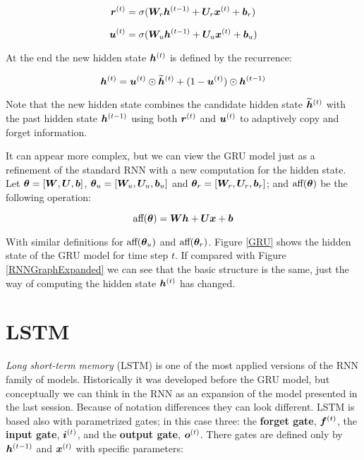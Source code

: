\begin{equation}
\bm{r}^{(t)} = \sigma(\bm{W}_{r} \bm{h}^{(t-1)} + \bm{U}_{r} \bm{x}^{(t)} + \bm{b}_{r})
\end{equation}


\begin{equation}
\bm{u}^{(t)} = \sigma(\bm{W}_{u} \bm{h}^{(t-1)} + \bm{U}_{u} \bm{x}^{(t)} + \bm{b}_{u})
\end{equation}

At the end the new hidden state $\bm{h}^{(t)}$ is defined by the recurrence:

\begin{equation}
\bm{h}^{(t)} = \bm{u}^{(t)} \odot \bm{\widetilde{h}}^{(t)} + (1 - \bm{u}^{(t)}) \odot \bm{h}^{(t-1)} 
\end{equation}

Note that the new hidden state combines the candidate hidden state $\bm{\widetilde{h}}^{(t)}$ with the past hidden state $\bm{h}^{(t-1)}$ using both $\bm{r}^{(t)}$ and $\bm{u}^{(t)}$ to adaptively copy and forget information.

\par It can appear more complex, but we can view the GRU model just as a refinement of the standard RNN with a new computation for the hidden state. Let $\bm{\theta} = [ \bm{W},\bm{U},\bm{b} ]$, $\bm{\theta}_{u} = [ \bm{W}_{u},\bm{U}_{u},\bm{b}_{u} ]$  and $\bm{\theta}_{r} = [ \bm{W}_{r},\bm{U}_{r},\bm{b}_{r} ]$; and $\text{aff}(\bm{\theta})$ be the following operation:

\begin{equation}
\text{aff}(\bm{\theta}) = \bm{W} \bm{h} + \bm{U} \bm{x} + \bm{b}
\end{equation}

With similar definitions for $\text{aff}(\bm{\theta}_{u})$ and $\text{aff}(\bm{\theta}_{r})$. Figure \ref{GRU} shows the hidden state of the GRU model for time step $t$. If compared with Figure \ref{RNNGraphExpanded} we can see that the basic structure is the same, just the way of computing the hidden state $\bm{h}^{(t)}$ has changed.


\section{LSTM}
\label{sec:LSTM}


\textit{Long short-term memory} (LSTM) is one of the most applied versions of the RNN family of models. Historically it was developed before the GRU model, but conceptually we can think in the RNN as an expansion of the model presented in the last session. Because of notation differences they can look different. LSTM is based also with parametrized gates; in this case three: the \textbf{forget gate}, $\bm{f}^{(t)}$, the \textbf{input gate}, $\bm{i}^{(t)}$, and the \textbf{output gate}, $\bm{o}^{(t)}$. There gates are defined only by $\bm{h}^{(t-1)}$ and $\bm{x}^{(t)}$ with specific parameters:

